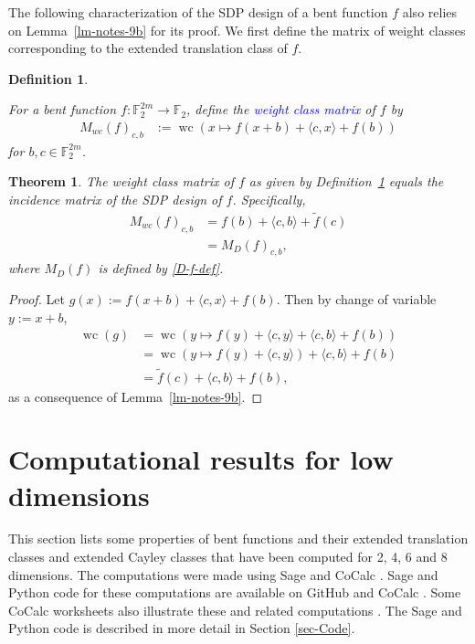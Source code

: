 \documentclass[12pt,a4paper]{article}
\newcommand{\mb}[1]{\mathbb{#1}}
\newcommand{\F}{\mb{F}}
\newcommand{\To}{\rightarrow}
\newcommand{\Emph}[1]{\emph{\textcolor{blue}{#1}}}
\newcommand{\dual}[1]{\widetilde{#1}}
\newcommand{\weightclass}[1]{\operatorname{wc}\left(#1\right)}
\newtheorem{Theorem}{Theorem}
\newtheorem{Definition}{Definition}
\begin{document}
The following characterization of the SDP design of a bent function $f$ also relies on
Lemma~\ref{lm-notes-9b} for its proof.
We first define the matrix of weight classes corresponding to the extended translation class of $f$.
\begin{Definition}
\label{def-weight-class-matrix}

For a bent function $f : \F_2^{2m} \To \F_2$,
define the \Emph{weight class matrix} of $f$ by
\begin{align*}
M_{wc}(f)_{c,b}
&:=
\weightclass{x \mapsto f(x+b) + \langle c, x \rangle + f(b)}
\end{align*}
for $b,c \in \F_2^{2m}$.
\end{Definition}

\begin{Theorem}
\label{th-Dillon-Schatz}
The weight class matrix of $f$ as given by Definition~\ref{def-weight-class-matrix}
equals the incidence matrix of the SDP design of $f$.
Specifically,
\begin{align*}
M_{wc}(f)_{c,b}
&=
f(b) + \langle c, b \rangle + \dual{f}(c)
\\
&=
M_D(f)_{c,b},
\end{align*}
where $M_D(f)$ is defined by \eqref{D-f-def}.
\end{Theorem}

\begin{proof}
Let $g(x) := f(x+b) + \langle c, x \rangle + f(b)$.
Then by change of variable $y:=x+b$,
\begin{align*}
\weightclass{g}
&=
\weightclass{y \mapsto f(y) + \langle c, y \rangle + \langle c, b \rangle + f(b)}
\\
&=
\weightclass{y \mapsto f(y) + \langle c, y \rangle} + \langle c, b \rangle + f(b)
\\
&=
\dual{f}(c) + \langle c, b \rangle + f(b),
\end{align*}
as a consequence of Lemma~\ref{lm-notes-9b}.
\end{proof}


\section{Computational results for low dimensions}
\label{sec-Empirical}
This section lists some properties of bent functions and their extended translation classes and extended Cayley classes
that have been computed for 2, 4, 6 and 8 dimensions.
The computations were made using Sage \cite{SageMath7517} and CoCalc \cite{SageMathCloud}.
Sage and Python code for these computations are available on GitHub \cite{Leo16GitHub} and CoCalc \cite{Leo16SMC}.
Some CoCalc worksheets also illustrate these and related computations \cite{Leo16SMC}.
The Sage and Python code is described in more detail in Section \ref{sec-Code}.
\end{document}
